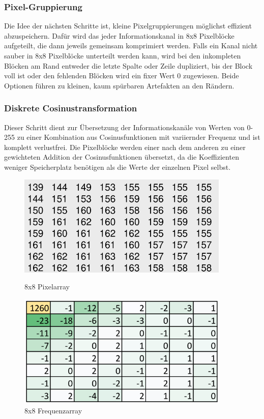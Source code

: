 \documentclass{article}
\begin{document}
\subsubsection{Pixel-Gruppierung}
Die Idee der nächsten Schritte ist, kleine Pixelgruppierungen möglichst effizient abzuspeichern. Dafür wird das jeder Informationskanal in 8x8 Pixelblöcke aufgeteilt, die dann jeweils gemeinsam komprimiert werden. Falls ein Kanal nicht sauber in 8x8 Pixelblöcke unterteilt werden kann, wird bei den inkompleten Blöcken am Rand entweder die letzte Spalte oder Zeile dupliziert, bis der Block voll ist oder den fehlenden Blöcken wird ein fixer Wert 0 zugewiesen. Beide Optionen führen zu kleinen, kaum spürbaren Artefakten an den Rändern.
\newpage
\subsubsection{Diskrete Cosinustransformation}
Dieser Schritt dient zur Übersetzung der Informationskanäle von Werten von 0-255 zu einer Kombination aus Cosinusfunktionen mit variiernder Frequenz und ist komplett verlustfrei. 
Die Pixelblöcke werden einer nach dem anderen zu einer gewichteten Addition der Cosinusfunktionen übersetzt, da die Koeffizienten weniger Speicherplatz benötigen als die Werte der einzelnen Pixel selbst.

\begin{figure}[h]
    \centering
    \begin{minipage}{0.45\textwidth}
        \centering
        \includegraphics[width=0.9\textwidth]{img/8x8_array.png} 
        \caption{8x8 Pixelarray}
    \end{minipage}\hfill
    \begin{minipage}{0.45\textwidth}
        \centering
        \includegraphics[width=0.9\textwidth]{img/dct_result.png} 
        \caption{8x8 Frequenzarray}
    \end{minipage}
\end{figure}
\end{document}
